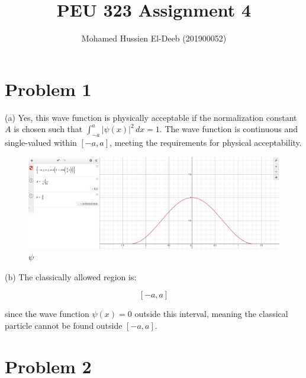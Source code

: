 \documentclass[12pt]{article}
\title{PEU 323 Assignment 4}
\author{Mohamed Hussien El-Deeb (201900052)}
\date{}
\begin{document}
\renewcommand{\labelenumi}{\textbf{(\alph{enumi})}}

\maketitle
\tableofcontents
\newpage
\section{Problem 1}

 (a) Yes, this wave function is physically acceptable if the normalization constant \( A \) is chosen such that \(\int_{-a}^{a} |\psi(x)|^2 \, dx = 1\). The wave function is continuous and single-valued within \([-a, a]\), meeting the requirements for physical acceptability.

\begin{figure}[H]
    \centering
    \includegraphics[width=0.7\linewidth]{Q1.png}
    \caption{$\psi$}
\end{figure}

(b) The classically allowed region is:

\[
    [-a, a]
\]

since the wave function \(\psi(x) = 0\) outside this interval, meaning the classical particle cannot be found outside \([-a, a]\).

\newpage
\section{Problem 2}
\end{document}
